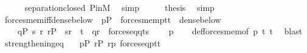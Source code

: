 \begin{isabellebody}
\ \ \ \ \isamarkupfalse%
\ separation{\isacharunderscore}{\kern0pt}closed\ P{\isacharunderscore}{\kern0pt}in{\isacharunderscore}{\kern0pt}M\ \isamarkupfalse%
\ simp\isanewline
\ \ \isamarkupfalse%
\ \isamarkupfalse%
\ {\isacharquery}{\kern0pt}thesis\ \isamarkupfalse%
\ simp\isanewline
{}\isamarkupfalse%
%
\endisatagproof
{\isafoldproof}%
%
\isadelimproof
\isanewline
%
\endisadelimproof
\isanewline
{}\isamarkupfalse%
\ forces{\isacharunderscore}{\kern0pt}mem{\isacharunderscore}{\kern0pt}iff{\isacharunderscore}{\kern0pt}dense{\isacharunderscore}{\kern0pt}below{\isacharcolon}{\kern0pt}\ \ {\isachardoublequoteopen}p{\isasymin}P\ {\isasymLongrightarrow}\ forces{\isacharunderscore}{\kern0pt}mem{\isacharparenleft}{\kern0pt}p{\isacharcomma}{\kern0pt}t{}{\isacharcomma}{\kern0pt}t{}{\isacharparenright}{\kern0pt}\ {\isasymlongleftrightarrow}\ dense{\isacharunderscore}{\kern0pt}below{\isacharparenleft}{\kern0pt}\isanewline
\ \ \ \ {\isacharbraceleft}{\kern0pt}q{\isasymin}P{\isachardot}{\kern0pt}\ {\isasymexists}s{\isachardot}{\kern0pt}\ {\isasymexists}r{\isachardot}{\kern0pt}\ r{\isasymin}P\ {\isasymand}\ {\isasymlangle}s{\isacharcomma}{\kern0pt}r{\isasymrangle}\ {\isasymin}\ t{}\ {\isasymand}\ q{\isasympreceq}r\ {\isasymand}\ forces{\isacharunderscore}{\kern0pt}eq{\isacharparenleft}{\kern0pt}q{\isacharcomma}{\kern0pt}t{}{\isacharcomma}{\kern0pt}s{\isacharparenright}{\kern0pt}{\isacharbraceright}{\kern0pt}\isanewline
\ \ \ \ {\isacharcomma}{\kern0pt}p{\isacharparenright}{\kern0pt}{\isachardoublequoteclose}\isanewline
%
\isadelimproof
\ \ %
\endisadelimproof
%
\isatagproof
{}\isamarkupfalse%
\ def{\isacharunderscore}{\kern0pt}forces{\isacharunderscore}{\kern0pt}mem{\isacharbrackleft}{\kern0pt}of\ p\ t{}\ t{}{\isacharbrackright}{\kern0pt}\ \isamarkupfalse%
\ blast%
\endisatagproof
{\isafoldproof}%
%
\isadelimproof
%
\endisadelimproof
%
\isadelimdocument
%
\endisadelimdocument
%
\isatagdocument
%
\isamarkuptrue%
%
\endisatagdocument
{\isafolddocument}%
%
\isadelimdocument
%
\endisadelimdocument
{}\isamarkupfalse%
\ strengthening{\isacharunderscore}{\kern0pt}eq{\isacharcolon}{\kern0pt}\isanewline
\ \ \ {\isachardoublequoteopen}p{\isasymin}P{\isachardoublequoteclose}\ {\isachardoublequoteopen}r{\isasymin}P{\isachardoublequoteclose}\ {\isachardoublequoteopen}r{\isasympreceq}p{\isachardoublequoteclose}\ {\isachardoublequoteopen}forces{\isacharunderscore}{\kern0pt}eq{\isacharparenleft}{\kern0pt}p{\isacharcomma}{\kern0pt}t{}{\isacharcomma}{\kern0pt}t{}{\isacharparenright}{\kern0pt}{\isachardoublequoteclose}\isanewline

\end{isabellebody}
